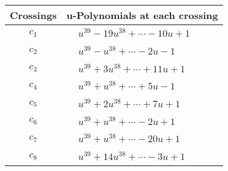 \documentclass[1p]{elsarticle_modified}
\theoremstyle{definition}
\begin{document}
\begin{tabular}{m{50pt}|m{274pt}}
Crossings & \hspace{64pt}u-Polynomials at each crossing \\
\hline $$\begin{aligned}c_{1}\end{aligned}$$&$\begin{aligned}
&u^{39}-19 u^{38}+\cdots-10 u+1
\end{aligned}$\\
\hline $$\begin{aligned}c_{2}\end{aligned}$$&$\begin{aligned}
&u^{39}- u^{38}+\cdots-2 u-1
\end{aligned}$\\
\hline $$\begin{aligned}c_{3}\end{aligned}$$&$\begin{aligned}
&u^{39}+3 u^{38}+\cdots+11 u+1
\end{aligned}$\\
\hline $$\begin{aligned}c_{4}\end{aligned}$$&$\begin{aligned}
&u^{39}+u^{38}+\cdots+5 u-1
\end{aligned}$\\
\hline $$\begin{aligned}c_{5}\end{aligned}$$&$\begin{aligned}
&u^{39}+2 u^{38}+\cdots+7 u+1
\end{aligned}$\\
\hline $$\begin{aligned}c_{6}\end{aligned}$$&$\begin{aligned}
&u^{39}+u^{38}+\cdots-2 u+1
\end{aligned}$\\
\hline $$\begin{aligned}c_{7}\end{aligned}$$&$\begin{aligned}
&u^{39}+u^{38}+\cdots-20 u+1
\end{aligned}$\\
\hline $$\begin{aligned}c_{8}\end{aligned}$$&$\begin{aligned}
&u^{39}+14 u^{38}+\cdots-3 u+1
\end{aligned}$\\

\end{tabular}
\end{document}
